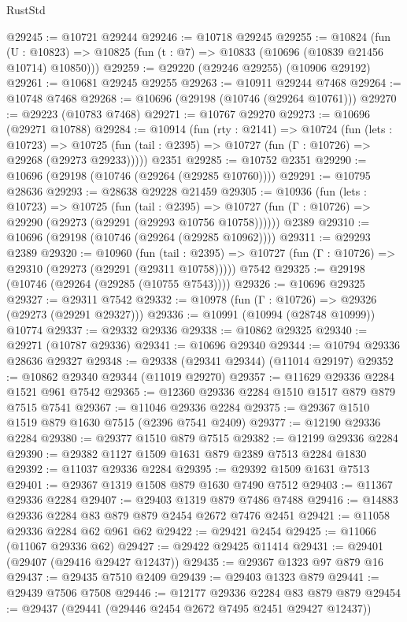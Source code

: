 \begin{lexlean}{RustStd}
\begin{coremodule}
@29245 := @10721 @29244
@29246 := @10718 @29245
@29255 := @10824
    (fun (U : @10823) => @10825 (fun (t : @7) => @10833 (@10696 (@10839 @21456 @10714) @10850)))
@29259 := @29220 (@29246 @29255) (@10906 @29192)
@29261 := @10681 @29245 @29255
@29263 := @10911 @29244 @7468
@29264 := @10748 @7468
@29268 := @10696 (@29198 (@10746 (@29264 @10761)))
@29270 := @29223 (@10783 @7468)
@29271 := @10767 @29270
@29273 := @10696 (@29271 @10788)
@29284 := @10914
    (fun (rty : @2141) =>
    @10724
      (fun (lets : @10723) =>
      @10725 (fun (tail : @2395) => @10727 (fun (Γ : @10726) => @29268 (@29273 @29233)))))
    @2351
@29285 := @10752 @2351
@29290 := @10696 (@29198 (@10746 (@29264 (@29285 @10760))))
@29291 := @10795 @28636
@29293 := @28638 @29228 @21459
@29305 := @10936
    (fun (lets : @10723) =>
    @10725
      (fun (tail : @2395) =>
      @10727 (fun (Γ : @10726) => @29290 (@29273 (@29291 (@29293 @10756 @10758))))))
    @2389
@29310 := @10696 (@29198 (@10746 (@29264 (@29285 @10962))))
@29311 := @29293 @2389
@29320 := @10960
    (fun (tail : @2395) => @10727 (fun (Γ : @10726) => @29310 (@29273 (@29291 (@29311 @10758)))))
    @7542
@29325 := @29198 (@10746 (@29264 (@29285 (@10755 @7543))))
@29326 := @10696 @29325
@29327 := @29311 @7542
@29332 := @10978 (fun (Γ : @10726) => @29326 (@29273 (@29291 @29327)))
@29336 := @10991 (@10994 (@28748 @10999)) @10774
@29337 := @29332 @29336
@29338 := @10862 @29325
@29340 := @29271 (@10787 @29336)
@29341 := @10696 @29340
@29344 := @10794 @29336 @28636 @29327
@29348 := @29338 (@29341 @29344) (@11014 @29197)
@29352 := @10862 @29340 @29344 (@11019 @29270)
@29357 := @11629 @29336 @2284 @1521 @961 @7542
@29365 := @12360 @29336 @2284 @1510 @1517 @879 @879 @7515 @7541
@29367 := @11046 @29336 @2284
@29375 := @29367 @1510 @1519 @879 @1630 @7515 (@2396 @7541 @2409)
@29377 := @12190 @29336 @2284
@29380 := @29377 @1510 @879 @7515
@29382 := @12199 @29336 @2284
@29390 := @29382 @1127 @1509 @1631 @879 @2389 @7513 @2284 @1830
@29392 := @11037 @29336 @2284
@29395 := @29392 @1509 @1631 @7513
@29401 := @29367 @1319 @1508 @879 @1630 @7490 @7512
@29403 := @11367 @29336 @2284
@29407 := @29403 @1319 @879 @7486 @7488
@29416 := @14883 @29336 @2284 @83 @879 @879 @2454 @2672 @7476 @2451
@29421 := @11058 @29336 @2284 @62 @961 @62
@29422 := @29421 @2454
@29425 := @11066 (@11067 @29336 @62)
@29427 := @29422 @29425 @11414
@29431 := @29401 (@29407 (@29416 @29427 @12437))
@29435 := @29367 @1323 @97 @879 @16
@29437 := @29435 @7510 @2409
@29439 := @29403 @1323 @879
@29441 := @29439 @7506 @7508
@29446 := @12177 @29336 @2284 @83 @879 @879
@29454 := @29437 (@29441 (@29446 @2454 @2672 @7495 @2451 @29427 @12437))

\end{coremodule}
\end{lexlean}
